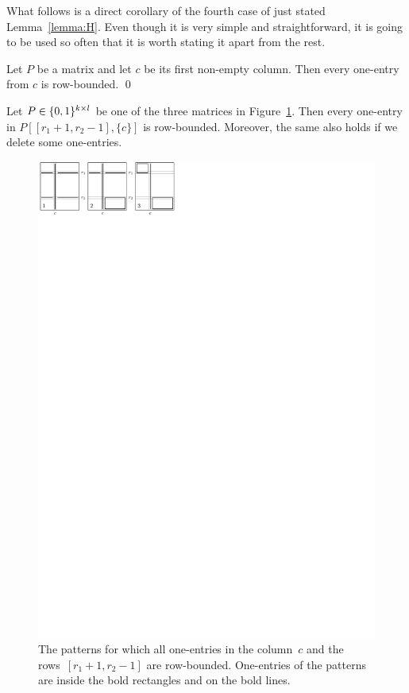 What follows is a direct corollary of the fourth case of just stated Lemma~\ref{lemma:H}. Even though it is very simple and straightforward, it is going to be used so often that it is worth stating it apart from the rest.

\begin{lemma}
\label{lemma:First}
Let $P$ be a matrix and let $c$ be its first non-empty column. Then every one-entry from $c$ is row-bounded. \qed
\end{lemma}

\begin{lemma}
\label{lemma:I}
Let $P\in\{0,1\}^{k\times l}$ be one of the three matrices in Figure~\ref{fig:lemmaI}. Then every one-entry in $P[[r_1+1,r_2-1],\{c\}]$ is row-bounded. Moreover, the same also holds if we delete some one-entries.

\begin{figure}[!ht]
\centering
\includegraphics[width=120mm]{img/lemmaI.pdf}
\caption{The patterns for which all one-entries in the column~$c$ and the rows~$[r_1+1,r_2-1]$ are row-bounded. One-entries of the patterns are inside the bold rectangles and on the bold lines.}
\label{fig:lemmaI}
\end{figure}
\end{lemma}
